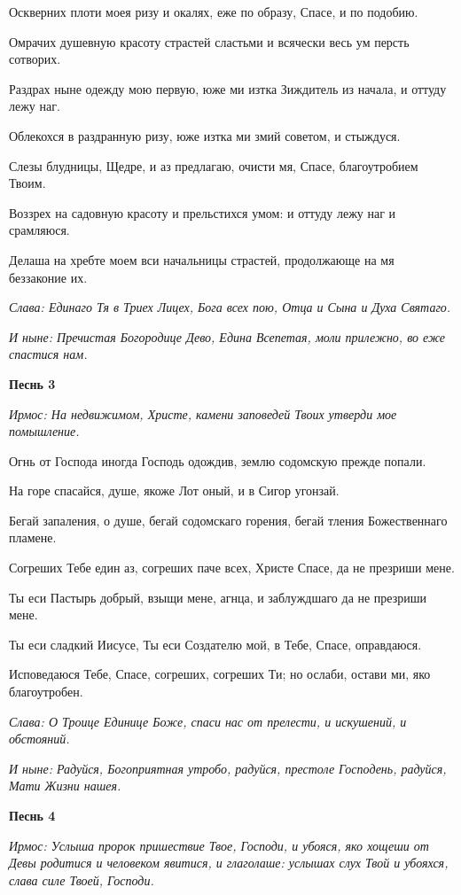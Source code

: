 Оскверних плоти моея ризу и окалях, еже по образу, Спасе, и по подобию. 

Омрачих душевную красоту страстей сластьми и всячески весь ум персть сотворих. 

Раздрах ныне одежду мою первую, юже ми изтка Зиждитель из начала, и оттуду лежу наг. 

Облекохся в раздранную ризу, юже изтка ми змий советом, и стыждуся. 

Слезы блудницы, Щедре, и аз предлагаю, очисти мя, Спасе, благоутробием Твоим. 

Воззрех на садовную красоту и прельстихся умом: и оттуду лежу наг и срамляюся. 

Делаша на хребте моем вси начальницы страстей, продолжающе на мя беззаконие их. 

\itshape Слава\normalfont{}: Единаго Тя в Триех Лицех, Бога всех пою, Отца и Сына и Духа Святаго. 

\itshape И ныне\normalfont{}: Пречистая Богородице Дево, Едина Всепетая, моли прилежно, во еже спастися нам. 

\medskip\bfseries Песнь 3\normalfont{}

\itshape Ирмос\normalfont{}: На недвижимом, Христе, камени заповедей Твоих утверди мое помышление. 

Огнь от Господа иногда Господь одождив, землю содомскую прежде попали. 

На горе спасайся, душе, якоже Лот оный, и в Сигор угонзай. 

Бегай запаления, о душе, бегай содомскаго горения, бегай тления Божественнаго пламене. 

Согреших Тебе един аз, согреших паче всех, Христе Спасе, да не презриши мене. 

Ты еси Пастырь добрый, взыщи мене, агнца, и заблуждшаго да не презриши мене. 

Ты еси сладкий Иисусе, Ты еси Создателю мой, в Тебе, Спасе, оправдаюся. 

Исповедаюся Тебе, Спасе, согреших, согреших Ти; но ослаби, остави ми, яко благоутробен. 

\itshape Слава\normalfont{}: О Троице Единице Боже, спаси нас от прелести, и искушений, и обстояний. 

\itshape И ныне\normalfont{}: Радуйся, Богоприятная утробо, радуйся, престоле Господень, радуйся, Мати Жизни нашея. 

\medskip\bfseries Песнь 4\normalfont{}

\itshape Ирмос\normalfont{}: Услыша пророк пришествие Твое, Господи, и убояся, яко хощеши от Девы родитися и человеком явитися, и глаголаше: услышах слух Твой и убояхся, слава силе Твоей, Господи. 

